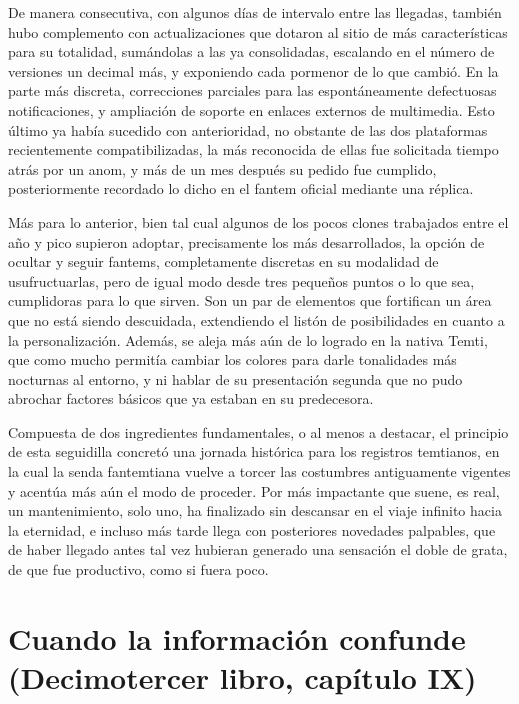 \documentclass[
]{book}
\begin{document}
De manera consecutiva, con algunos días de intervalo entre las llegadas, también hubo complemento con actualizaciones que dotaron al sitio de más características para su totalidad, sumándolas a las ya consolidadas, escalando en el número de versiones un decimal más, y exponiendo cada pormenor de lo que cambió. En la parte más discreta, correcciones parciales para las espontáneamente defectuosas notificaciones, y ampliación de soporte en enlaces externos de multimedia. Esto último ya había sucedido con anterioridad, no obstante de las dos plataformas recientemente compatibilizadas, la más reconocida de ellas fue solicitada tiempo atrás por un anom, y más de un mes después su pedido fue cumplido, posteriormente recordado lo dicho en el fantem oficial mediante una réplica.

Más para lo anterior, bien tal cual algunos de los pocos clones trabajados entre el año y pico supieron adoptar, precisamente los más desarrollados, la opción de ocultar y seguir fantems, completamente discretas en su modalidad de usufructuarlas, pero de igual modo desde tres pequeños puntos o lo que sea, cumplidoras para lo que sirven. Son un par de elementos que fortifican un área que no está siendo descuidada, extendiendo el listón de posibilidades en cuanto a la personalización. Además, se aleja más aún de lo logrado en la nativa Temti, que como mucho permitía cambiar los colores para darle tonalidades más nocturnas al entorno, y ni hablar de su presentación segunda que no pudo abrochar factores básicos que ya estaban en su predecesora.

Compuesta de dos ingredientes fundamentales, o al menos a destacar, el principio de esta seguidilla concretó una jornada histórica para los registros temtianos, en la cual la senda fantemtiana vuelve a torcer las costumbres antiguamente vigentes y acentúa más aún el modo de proceder. Por más impactante que suene, es real, un mantenimiento, solo uno, ha finalizado sin descansar en el viaje infinito hacia la eternidad, e incluso más tarde llega con posteriores novedades palpables, que de haber llegado antes tal vez hubieran generado una sensación el doble de grata, de que fue productivo, como si fuera poco.

\hypertarget{cuando-la-informaciuxf3n-confunde-decimotercer-libro-capuxedtulo-ix}{%
\section{Cuando la información confunde (Decimotercer libro, capítulo IX)}\label{cuando-la-informaciuxf3n-confunde-decimotercer-libro-capuxedtulo-ix}}
\end{document}
